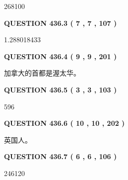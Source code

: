 \documentclass{ctexart}
\begin{document}
268100
 
 
  
\vspace{0.2in}
  
{\textbf{\Large{QUESTION
436.3 
 ( 7 , 7 , 107 )
}}}
  
  
 
 
\noindent{}

1.288018433
 
 
  
\vspace{0.2in}
  
{\textbf{\Large{QUESTION
436.4 
 ( 9 , 9 , 201 )
}}}
  
  
 
 
\noindent{}
 
 
加拿大的首都是渥太华。
 
 
 
 
  
\vspace{0.2in}
  
{\textbf{\Large{QUESTION
436.5 
 ( 3 , 3 , 103 )
}}}
  
  
 
 
\noindent{}

596
 
 
  
\vspace{0.2in}
  
{\textbf{\Large{QUESTION
436.6 
 ( 10 , 10 , 202 )
}}}
  
  
 
 
\noindent{}
 
 
英国人。
 
 
 
 
  
\vspace{0.2in}
  
{\textbf{\Large{QUESTION
436.7 
 ( 6 , 6 , 106 )
}}}
  
  
 
 
\noindent{}

246120
 
 
  
\end{document}
